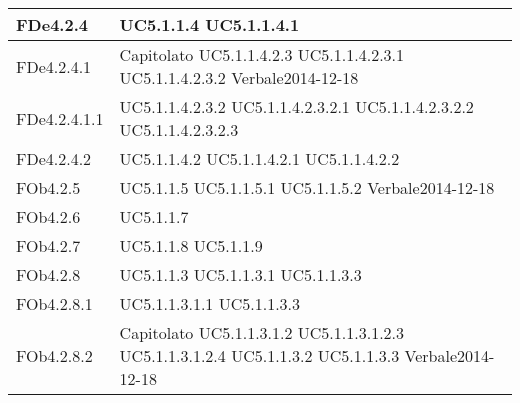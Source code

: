 \begin{longtable}{|l|p{4cm}|}
\hline
FDe4.2.4 & UC5.1.1.4 \linebreak  UC5.1.1.4.1 \linebreak  \\ 
\hline
FDe4.2.4.1 & Capitolato \linebreak  UC5.1.1.4.2.3 \linebreak  UC5.1.1.4.2.3.1 \linebreak  UC5.1.1.4.2.3.2 \linebreak  Verbale2014-12-18 \linebreak  \\ 
\hline
FDe4.2.4.1.1 & UC5.1.1.4.2.3.2 \linebreak  UC5.1.1.4.2.3.2.1 \linebreak  UC5.1.1.4.2.3.2.2 \linebreak  UC5.1.1.4.2.3.2.3 \linebreak  \\ 
\hline
FDe4.2.4.2 & UC5.1.1.4.2 \linebreak  UC5.1.1.4.2.1 \linebreak  UC5.1.1.4.2.2 \linebreak  \\ 
\hline
FOb4.2.5 & UC5.1.1.5 \linebreak  UC5.1.1.5.1 \linebreak  UC5.1.1.5.2 \linebreak  Verbale2014-12-18 \linebreak  \\ 
\hline
FOb4.2.6 & UC5.1.1.7 \linebreak  \\ 
\hline
FOb4.2.7 & UC5.1.1.8 \linebreak  UC5.1.1.9 \linebreak  \\ 
\hline
FOb4.2.8 & UC5.1.1.3 \linebreak  UC5.1.1.3.1 \linebreak  UC5.1.1.3.3 \linebreak  \\ 
\hline
FOb4.2.8.1 & UC5.1.1.3.1.1 \linebreak  UC5.1.1.3.3 \linebreak  \\ 
\hline
FOb4.2.8.2 & Capitolato \linebreak  UC5.1.1.3.1.2 \linebreak  UC5.1.1.3.1.2.3 \linebreak  UC5.1.1.3.1.2.4 \linebreak  UC5.1.1.3.2 \linebreak  UC5.1.1.3.3 \linebreak  Verbale2014-12-18 \linebreak  \\ 

\end{longtable}
